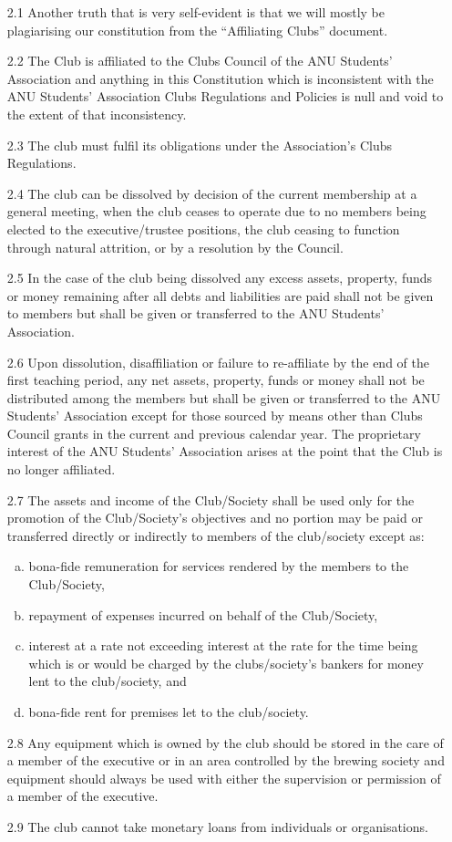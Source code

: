 \documentclass{article}
\begin{document}
\begin{enumerate}
    \item[2.1] Another truth that is very self-evident is that we will mostly be plagiarising our constitution from the “Affiliating Clubs” document.
    \item[2.2] The Club is affiliated to the Clubs Council of the ANU Students’ Association and anything in this Constitution which is inconsistent with the ANU Students’ Association Clubs Regulations and Policies is null and void to the extent of that inconsistency.
    \item[2.3] The club must fulfil its obligations under the Association’s Clubs Regulations.
    \item[2.4] The club can be dissolved by decision of the current membership at a general meeting, when the club ceases to operate due to no members being elected to the executive/trustee positions, the club ceasing to function through natural attrition, or by a resolution by the Council. 
    \item[2.5] In the case of the club being dissolved any excess assets, property, funds or money remaining after all debts and liabilities are paid shall not be given to members but shall be given or transferred to the ANU Students’ Association.
    \item[2.6] Upon dissolution, disaffiliation or failure to re-affiliate by the end of the first teaching period, any net assets, property, funds or money shall not be distributed among the members but shall be given or transferred to the ANU Students’ Association except for those sourced by means other than Clubs Council grants in the current and previous calendar year. The proprietary interest of the ANU Students’ Association arises at the point that the Club is no longer affiliated.
    \item[2.7] The assets and income of the Club/Society shall be used only for the promotion of the Club/Society’s objectives and no portion may be paid or transferred directly or indirectly to members of the club/society except as:
    \begin{enumerate}[a.]
        \item bona-fide remuneration for services rendered by the members to the Club/Society,
        \item repayment of expenses incurred on behalf of the Club/Society,
        \item interest at a rate not exceeding interest at the rate for the time being which is or would be charged by the clubs/society’s bankers for money lent to the club/society, and
        \item bona-fide rent for premises let to the club/society.
    \end{enumerate}
    \item[2.8] Any equipment which is owned by the club should be stored in the care of a member of the executive or in an area controlled by the brewing society and equipment should always be used with either the supervision or permission of a member of the executive.
    \item[2.9] The club cannot take monetary loans from individuals or organisations. 
\end{enumerate}
\end{document}
